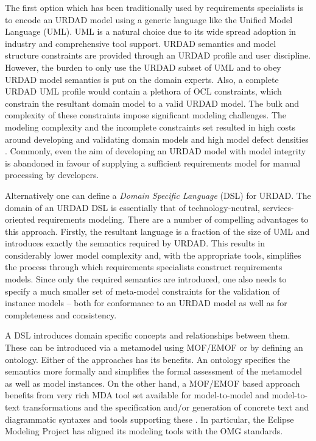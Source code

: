 The first option which has been traditionally used by requirements specialists is to encode an URDAD model using a generic language like the Unified Model Language (UML). UML is a natural choice due to its wide spread adoption in industry and comprehensive tool support. URDAD semantics and model structure constraints are provided through an URDAD profile and user discipline.  However, the burden to only use the URDAD subset of UML and to obey URDAD model semantics is put on the domain experts. Also, a complete URDAD UML profile would contain a plethora of OCL constraints, which constrain the resultant domain model to a valid URDAD model. The bulk and complexity of these constraints impose significant modeling challenges. The modeling complexity and the incomplete constraints set resulted in high costs around developing and validating domain models and high model defect densities \cite{}. Commonly, even the aim of developing an URDAD model with model integrity is abandoned in favour of supplying a sufficient requirements model for manual processing by developers.

Alternatively one can define a {\em Domain Specific Language} (DSL) for URDAD. The domain of an URDAD DSL is essentially that of technology-neutral, services-oriented requirements modeling. There are a number of compelling advantages to this approach. Firstly, the resultant language is a fraction of the size of UML and introduces exactly the semantics required by URDAD. This results in considerably lower model complexity and, with the appropriate tools, simplifies the process through which requirements specialists construct requirements models. Since only the required semantics are introduced, one also needs to specify a much smaller set of  meta-model constraints for the validation of instance models -- both for conformance to an URDAD model as well as for completeness and consistency.

A DSL introduces domain specific concepts and relationships between them. These can be introduced via a metamodel using MOF/EMOF or by defining an ontology. Either of the approaches has its benefits. An ontology specifies the semantics more formally and simplifies the formal assessment of the metamodel as well as model instances. On the other hand, a MOF/EMOF based approach benefits from very rich MDA tool set available for model-to-model and model-to-text transformations and the specification and/or generation of concrete text and diagrammatic syntaxes and tools supporting these \cite{gronback_model_2008}. In particular, the Eclipse Modeling Project has aligned its modeling tools with the OMG standards.

